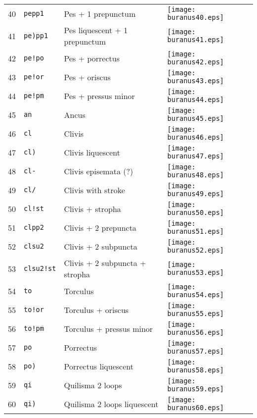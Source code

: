 \documentclass{scrarticle}
\begin{document}
\begin{longtable}{l|l|l|l}
40 & \texttt{pepp1} & Pes + 1 prepunctum & \texttt{[image: buranus40.eps]} \\
41 & \texttt{pe)pp1} & Pes liquescent + 1 prepunctum & \texttt{[image: buranus41.eps]} \\
42 & \texttt{pe!po} & Pes + porrectus & \texttt{[image: buranus42.eps]} \\
43 & \texttt{pe!or} & Pes + oriscus & \texttt{[image: buranus43.eps]} \\
44 & \texttt{pe!pm} & Pes + pressus minor & \texttt{[image: buranus44.eps]} \\
45 & \texttt{an} & Ancus & \texttt{[image: buranus45.eps]} \\
46 & \texttt{cl} & Clivis & \texttt{[image: buranus46.eps]} \\
47 & \texttt{cl)} & Clivis liquescent & \texttt{[image: buranus47.eps]} \\
48 & \texttt{cl-} & Clivis episemata (?) & \texttt{[image: buranus48.eps]} \\
49 & \texttt{cl/} & Clivis with stroke & \texttt{[image: buranus49.eps]} \\
50 & \texttt{cl!st} & Clivis + stropha & \texttt{[image: buranus50.eps]} \\
51 & \texttt{clpp2} & Clivis + 2 prepuncta & \texttt{[image: buranus51.eps]} \\
52 & \texttt{clsu2} & Clivis + 2 subpuncta & \texttt{[image: buranus52.eps]} \\
53 & \texttt{clsu2!st} & Clivis + 2 subpuncta + stropha & \texttt{[image: buranus53.eps]} \\
54 & \texttt{to} & Torculus & \texttt{[image: buranus54.eps]} \\
55 & \texttt{to!or} & Torculus + oriscus & \texttt{[image: buranus55.eps]} \\
56 & \texttt{to!pm} & Torculus + pressus minor & \texttt{[image: buranus56.eps]} \\
57 & \texttt{po} & Porrectus & \texttt{[image: buranus57.eps]} \\
58 & \texttt{po)} & Porrectus liquescent & \texttt{[image: buranus58.eps]} \\
59 & \texttt{qi} & Quilisma 2 loops & \texttt{[image: buranus59.eps]} \\
60 & \texttt{qi)} & Quilisma 2 loops liquescent & \texttt{[image: buranus60.eps]} \\

\end{longtable}
\end{document}
